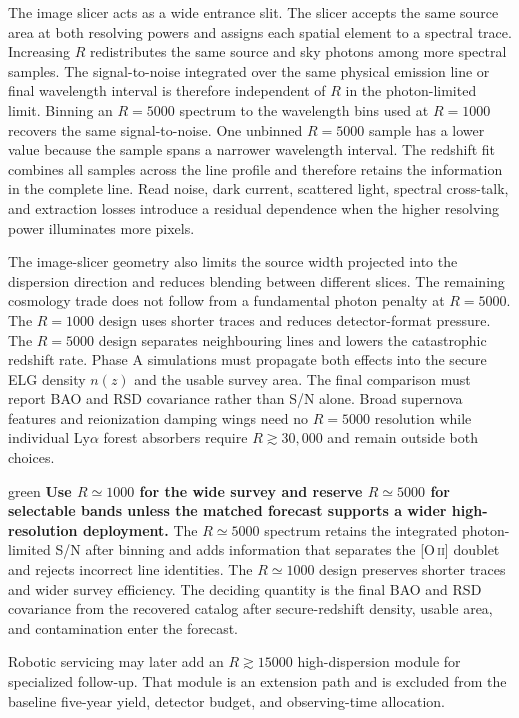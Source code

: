The image slicer acts as a wide entrance slit. The slicer accepts the same source area at both resolving powers and assigns each spatial element to a spectral trace. Increasing $R$ redistributes the same source and sky photons among more spectral samples. The signal-to-noise integrated over the same physical emission line or final wavelength interval is therefore independent of $R$ in the photon-limited limit. Binning an $R=5000$ spectrum to the wavelength bins used at $R=1000$ recovers the same signal-to-noise. One unbinned $R=5000$ sample has a lower value because the sample spans a narrower wavelength interval. The redshift fit combines all samples across the line profile and therefore retains the information in the complete line. Read noise, dark current, scattered light, spectral cross-talk, and extraction losses introduce a residual dependence when the higher resolving power illuminates more pixels.

The image-slicer geometry also limits the source width projected into the dispersion direction and reduces blending between different slices. The remaining cosmology trade does not follow from a fundamental photon penalty at $R=5000$. The $R=1000$ design uses shorter traces and reduces detector-format pressure. The $R=5000$ design separates neighbouring lines and lowers the catastrophic redshift rate. Phase A simulations must propagate both effects into the secure ELG density $n(z)$ and the usable survey area. The final comparison must report BAO and RSD covariance rather than S/N alone. Broad supernova features and reionization damping wings need no $R=5000$ resolution while individual Ly$\alpha$ forest absorbers require $R\gtrsim30{,}000$ and remain outside both choices.

\begin{leadbox}[title=Cosmology Selection Rule]{green}
\textbf{Use $R\simeq1000$ for the wide survey and reserve $R\simeq5000$ for selectable bands unless the matched forecast supports a wider high-resolution deployment.}
The $R\simeq5000$ spectrum retains the integrated photon-limited S/N after binning and adds information that separates the [O\,\textsc{ii}] doublet and rejects incorrect line identities. The $R\simeq1000$ design preserves shorter traces and wider survey efficiency. The deciding quantity is the final BAO and RSD covariance from the recovered catalog after secure-redshift density, usable area, and contamination enter the forecast.
\end{leadbox}

Robotic servicing may later add an $R\gtrsim15000$ high-dispersion module for
specialized follow-up. That module is an extension path and is excluded from
the baseline five-year yield, detector budget, and observing-time allocation.

